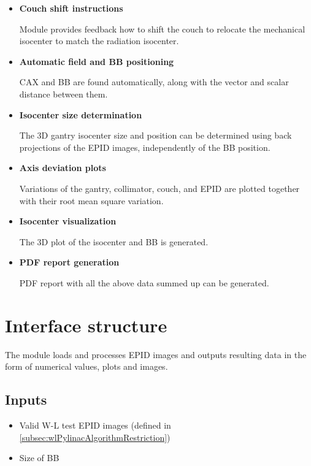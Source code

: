 \begin{itemize}

    \item \textbf{Couch shift instructions}

    Module provides feedback how to shift the couch to relocate the mechanical isocenter to match the radiation isocenter.

    \item \textbf{Automatic field and BB positioning}

    CAX and BB are found automatically, along with the vector and scalar distance between them.

    \item \textbf{Isocenter size determination}

    The 3D gantry isocenter size and position can be determined using back projections of the EPID images, independently of the BB position.

    \item \textbf{Axis deviation plots}

    Variations of the gantry, collimator, couch, and EPID are plotted together with their root mean square variation.

    \item \textbf{Isocenter visualization}

    The 3D plot of the isocenter and BB is generated.

    \item \textbf{PDF report generation}

    PDF report with all the above data summed up can be generated.
    
\end{itemize}

\section{Interface structure}

The module loads and processes EPID images and outputs resulting data in the form of numerical values, plots and images.

\subsection{Inputs}

\begin{itemize}

    \item Valid W-L test EPID images (defined in \autoref{subsec:wlPylinacAlgorithmRestriction})
    \item Size of BB
    
\end{itemize}

